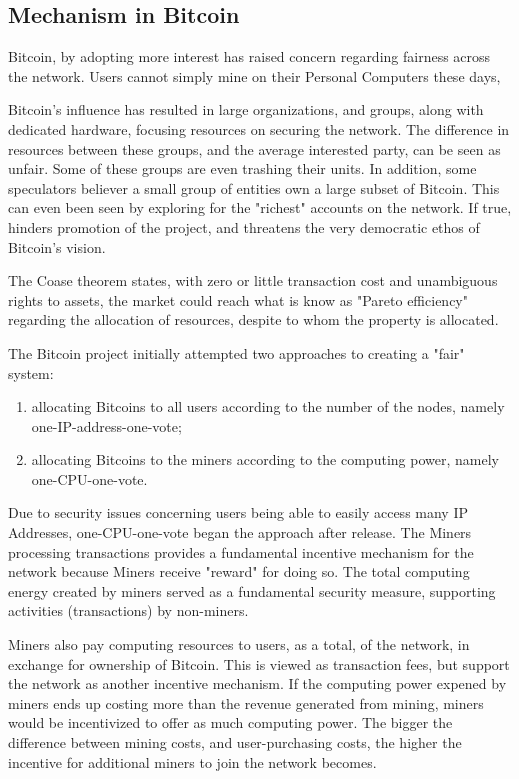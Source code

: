 \documentclass[12pt, titlepage, twocolumn]{report}
\begin{document}
\subsection{Mechanism in Bitcoin}
Bitcoin, by adopting more interest has raised concern regarding fairness across the network. Users cannot simply mine on their Personal Computers these days,

Bitcoin's influence has resulted in large organizations, and groups, along with dedicated hardware, focusing resources on securing the network. The difference in resources between these groups, and the average interested party, can be seen as unfair. Some of these groups are even trashing their units. In addition, some speculators believer a small group of entities own a large subset of Bitcoin. This can even been seen by exploring for the "richest" accounts on the network. If true, hinders promotion of the project, and threatens the very democratic ethos of Bitcoin's vision. 

The Coase theorem states, with zero or little transaction cost and unambiguous rights to assets, the market could reach what is know as "Pareto efficiency" regarding the allocation of resources, despite to whom the property is allocated. 

The Bitcoin project initially attempted two approaches to creating a "fair" system: 

\begin{enumerate}
	\item allocating Bitcoins to all users according to the number of the nodes, namely one-IP-address-one-vote; 
	\item allocating Bitcoins to the miners according to the computing power, namely one-CPU-one-vote.
\end{enumerate}
 
 
 Due to security issues concerning users being able to easily access many IP Addresses, one-CPU-one-vote began the approach after release. The Miners processing transactions provides a fundamental incentive mechanism for the network because Miners receive "reward" for doing so. The total computing energy created by miners served as a fundamental security measure, supporting activities (transactions) by non-miners.

Miners also pay computing resources to users, as a total, of the network, in exchange for ownership of Bitcoin. This is viewed as transaction fees, but support the network as another incentive mechanism. If the computing power expened by miners ends up costing more than the revenue generated from mining, miners would be incentivized to offer as much computing power. The bigger the difference between mining costs, and user-purchasing costs, the higher the incentive for additional miners to join the network becomes. 
\end{document}

